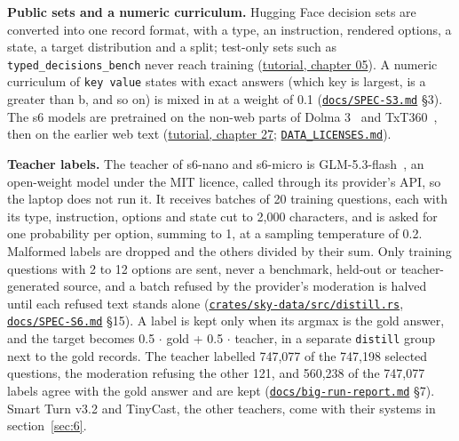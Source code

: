 \documentclass[10pt]{article}
\begin{document}
\textbf{Public sets and a numeric curriculum.} Hugging Face decision sets are converted into one record format, with a type, an instruction, rendered options, a state, a target distribution and a split; test-only sets such as \texttt{typed\_\allowbreak{}decisions\_\allowbreak{}bench} never reach training (\href{https://maxgfr.github.io/skycmd/tutorial/05-hugging-face-data}{tutorial, chapter 05}). A numeric curriculum of \texttt{key value} states with exact answers (which key is largest, is a greater than b, and so on) is mixed in at a weight of 0.1 (\href{https://github.com/maxgfr/skycmd/blob/main/docs/SPEC-S3.md}{\texttt{docs/\allowbreak{}SPEC-S3.md}} §3). The s6 models are pretrained on the non-web parts of Dolma 3~\cite{dolma3} and TxT360~\cite{txt360}, then on the earlier web text (\href{https://maxgfr.github.io/skycmd/tutorial/27-s6-nano}{tutorial, chapter 27}; \href{https://github.com/maxgfr/skycmd/blob/main/DATA_LICENSES.md}{\texttt{DATA\_\allowbreak{}LICENSES.md}}).

\textbf{Teacher labels.} The teacher of s6-nano and s6-micro is GLM-5.3-flash~\cite{glm53flash}, an open-weight model under the MIT licence, called through its provider's API, so the laptop does not run it. It receives batches of 20 training questions, each with its type, instruction, options and state cut to 2,000 characters, and is asked for one probability per option, summing to 1, at a sampling temperature of 0.2. Malformed labels are dropped and the others divided by their sum. Only training questions with 2 to 12 options are sent, never a benchmark, held-out or teacher-generated source, and a batch refused by the provider's moderation is halved until each refused text stands alone (\href{https://github.com/maxgfr/skycmd/blob/main/crates/sky-data/src/distill.rs}{\texttt{crates/\allowbreak{}sky-data/\allowbreak{}src/\allowbreak{}distill.rs}}, \href{https://github.com/maxgfr/skycmd/blob/main/docs/SPEC-S6.md}{\texttt{docs/\allowbreak{}SPEC-S6.md}} §15). A label is kept only when its argmax is the gold answer, and the target becomes 0.5 $\cdot$ gold + 0.5 $\cdot$ teacher, in a separate \texttt{distill} group next to the gold records. The teacher labelled 747,077 of the 747,198 selected questions, the moderation refusing the other 121, and 560,238 of the 747,077 labels agree with the gold answer and are kept (\href{https://github.com/maxgfr/skycmd/blob/main/docs/big-run-report.md}{\texttt{docs/\allowbreak{}big-run-report.md}} §7). Smart Turn v3.2 and TinyCast, the other teachers, come with their systems in section~\ref{sec:6}.
\end{document}
